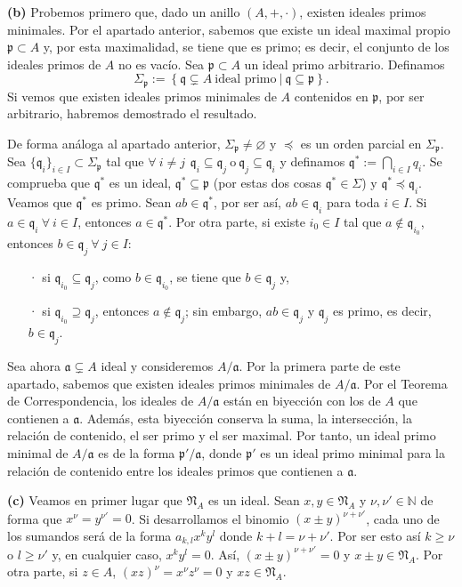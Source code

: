 \documentclass[a4paper,12pt]{article}
\newcommand{\N}{\mathbb{N}}
\newcommand{\p}{\mathfrak{p}}
\newcommand{\q}{\mathfrak{q}}
\newcommand{\af}{\mathfrak{a}}
\newcommand{\Nf}{\mathfrak{N}}
\begin{document}
\textbf{(b)} Probemos primero que, dado un anillo $(A,+,\cdot)$, existen ideales primos minimales. Por el apartado anterior, sabemos que existe un ideal maximal propio $\p\subset A$ y, por esta maximalidad, se tiene que es primo; es decir, el conjunto de los ideales primos de $A$ no es vacío. Sea $\p\subset A$ un ideal primo arbitrario.
Definamos$$\Sigma_{\p}:=\left\{\q\subsetneq A\ \text{ideal primo}\ |\ \q\subseteq\p \right\}.$$Si vemos que existen ideales primos minimales de $A$ contenidos en $\p$, por ser arbitrario, habremos demostrado el resultado.

De forma análoga al apartado anterior, $\Sigma_{\p}\neq\varnothing$ y $\preceq$ es un orden parcial en $\Sigma_{\p}$. Sea $\{\q_i\}_{i\in I}\subset\Sigma_{\p}$ tal que $\forall\ i\neq j\hspace{5pt}\q_i\subseteq\q_j\ \text{o}\ \q_j\subseteq\q_i$ y definamos $\q^*:=\bigcap_{i\in I}q_i$. 
Se comprueba que $\q^*$ es un ideal, $\q^*\subseteq\p$ (por estas dos cosas $\q^*\in\Sigma$) y $\q^*\preceq\q_i$. 
Veamos que $\q^*$ es primo. Sean $ab\in\q^*$, por ser así, $ab\in\q_i$ para toda $i\in I$. Si $a\in\q_i\ \forall\ i\in I$, entonces $a\in\q^*$. Por otra parte, si existe $i_0\in I$ tal que $a\notin\q_{i_0}$, entonces $b\in\q_j\ \forall\ j\in I$:\begin{itemize}
    \item[·] si $\q_{i_0}\subseteq\q_j$, como $b\in\q_{i_0}$, se tiene que $b\in\q_j$ y,
    \item[·] si $\q_{i_0}\supseteq\q_j$, entonces $a\notin\q_j$; sin embargo, $ab\in\q_j$ y $\q_j$ es primo, es decir, $b\in\q_j$.
\end{itemize}
Sea ahora $\af\subsetneq A$ ideal y consideremos $A/\af$. Por la primera parte de este apartado, sabemos que existen ideales primos minimales de $A/\af$.
Por el Teorema de Correspondencia, los ideales de $A/\af$ están en biyección con los de $A$ que contienen a $\af$.
Además, esta biyección conserva la suma, la intersección, la relación de contenido, el ser primo y el ser maximal. 
Por tanto, un ideal primo minimal de $A/\af$ es de la forma $\p'/\af$, donde $\p'$ es un ideal primo minimal para la relación de contenido entre los ideales primos que contienen a $\af$.

\textbf{(c)} Veamos en primer lugar que $\Nf_A$ es un ideal. Sean $x,y\in\Nf_A$ y $\nu,\nu'\in\N$ de forma que $x^\nu=y^{\nu'}=0$. Si desarrollamos el binomio $(x\pm y)^{\nu+\nu'}$, cada uno de los sumandos será de la forma $a_{k,l}x^ky^l$ donde $k+l=\nu+\nu'$. Por ser esto así $k\geq\nu$ o $l\geq\nu'$ y, en cualquier caso, $x^ky^l=0$. Así, $(x\pm y)^{\nu+\nu'}=0$ y $x\pm y\in\Nf_A$. Por otra parte, si $z\in A$, $(xz)^\nu=x^\nu z^\nu=0$ y $xz\in\Nf_A$.
\end{document}
